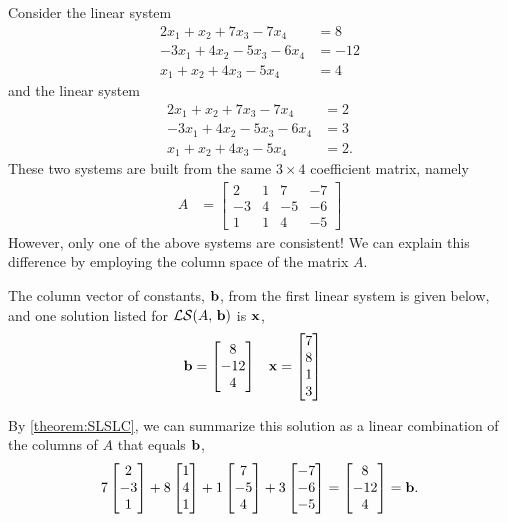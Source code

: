 \documentclass{ximera}
\begin{document}
\begin{example}
  Consider the linear system
  \begin{align*}
    2x_1  + x_2 + 7x_3 - 7x_4 &= 8 \\
    -3x_1 + 4x_2 -5x_3 - 6x_4 &=  -12 \\
    x_1 +x_2 + 4x_3 - 5x_4 &=  4
  \end{align*}
  and the linear system
  \begin{align*}
    2x_1  + x_2 + 7x_3 - 7x_4 &= 2 \\
    -3x_1 + 4x_2 -5x_3 - 6x_4 &=  3 \\
    x_1 +x_2 + 4x_3 - 5x_4 &=  2.
  \end{align*}
  These two systems are built from the same $3\times 4$ coefficient matrix, namely
  \begin{align*}
    A&=\begin{bmatrix}
      2 & 1 & 7 & -7 \\
      -3 & 4 &  -5 & -6 \\
      1 & 1 & 4 &  -5
    \end{bmatrix}
  \end{align*}
  However, only one of the above systems are consistent!  We can
  explain this difference by employing the column space of the matrix
  $A$.

  The column vector of constants, $\mathbf{b}$, from the first linear
  system is given below, and one solution listed for
  $\mathcal{LS}\!\left(A,\,\mathbf{b}\right)$ is $\mathbf{x}$,
  \begin{align*}
    \mathbf{b}&=\begin{bmatrix}8\\-12\\4\end{bmatrix}
            &
              \mathbf{x}&=\begin{bmatrix}7\\8\\1\\3\end{bmatrix}
  \end{align*}

  By \ref{theorem:SLSLC}, we can summarize this solution as a linear
  combination of the columns of $A$ that equals $\mathbf{b}$,
  \[
    7\begin{bmatrix}2\\-3\\1\end{bmatrix}+
    8\begin{bmatrix}1\\4\\1\end{bmatrix}+
    1\begin{bmatrix}7\\-5\\4\end{bmatrix}+
    3\begin{bmatrix}-7\\-6\\-5\end{bmatrix}=
    \begin{bmatrix}8\\-12\\4\end{bmatrix}=\mathbf{b}.
  \]


\end{example}
\end{document}
